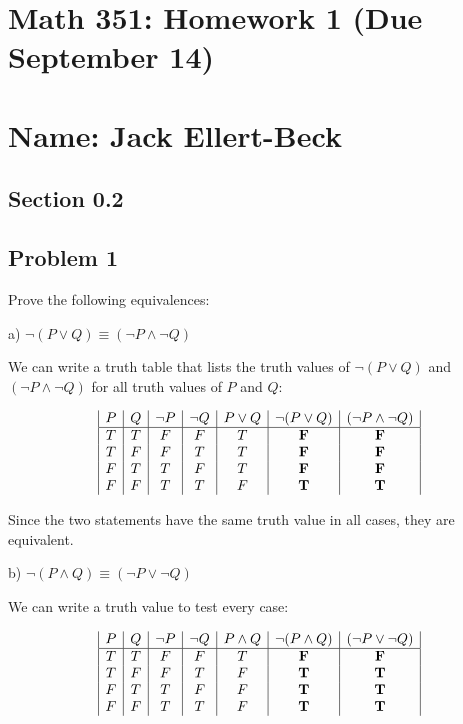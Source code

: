 \documentclass[11pt]{article}
\begin{document}
\setlength{\parindent}{0pt}
\setlength{\parskip}{9pt}


\section*{Math 351: Homework 1 (Due September 14)}
\section*{Name: Jack Ellert-Beck}

\bigskip

\subsection*{Section 0.2}
\subsection*{Problem 1}

Prove the following equivalences:

a) $\lnot (P \lor Q) \equiv (\neg P \land \lnot Q)$

We can write a truth table that lists the truth values of
$\lnot (P \lor Q)$ and $(\neg P \land \lnot Q)$ for all truth values of $P$ and $Q$:

$$
\begin{array}{|c|c|c|c|c|c|c|}
P & Q & \lnot P & \lnot Q & P \lor Q & \lnot (P \lor Q) & (\lnot P \land \lnot Q) \\
\hline
T & T & F & F & T & \bf F & \bf F \\
T & F & F & T & T & \bf F & \bf F \\
F & T & T & F & T & \bf F & \bf F \\
F & F & T & T & F & \bf T & \bf T \\
\end{array}
$$

Since the two statements have the same truth value in all cases, they are equivalent.

b) $\lnot (P \land Q) \equiv (\lnot P \lor \lnot Q)$

We can write a truth value to test every case:

$$
\begin{array}{|c|c|c|c|c|c|c|}
P & Q & \lnot P & \lnot Q & P \land Q & \lnot (P \land Q) & (\lnot P \lor \lnot Q) \\
\hline
T & T & F & F & T & \bf F & \bf F \\
T & F & F & T & F & \bf T & \bf T \\
F & T & T & F & F & \bf T & \bf T \\
F & F & T & T & F & \bf T & \bf T \\
\end{array}
$$
\end{document}
